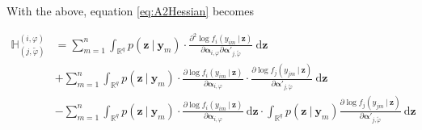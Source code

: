 \documentclass[11pt, a4paper]{article}
\newcommand{\R}{{\ensuremath{\mathbb{R}}}}
\newcommand{\cond}{\!~|~\!}
\begin{document}
With the above, equation \eqref{eq:A2Hessian} becomes

\begin{align*}
\mathbb{H}_{(j,\tilde{\varphi})}^{(i,\varphi)} & =  \sum\limits_{m=1}^{n} \int_{\R^q} p(\mathbf{z} \cond \mathbf{y}_m) \cdot \frac{\partial^2 \log f_i(y_{im} \cond \mathbf{z})}{\partial \bm{\alpha}_{i,\varphi} \partial \bm{\alpha}'_{j,\tilde{\varphi}}} ~ \text{d}\mathbf{z} \\[3mm]
& + \sum\limits_{m=1}^{n} \int_{\R^q} p(\mathbf{z} \cond \mathbf{y}_m) \cdot \frac{\partial \log f_i(y_{im} \cond \mathbf{z})}{\partial \bm{\alpha}_{i,\varphi}} \cdot \frac{\partial \log f_j(y_{jm} \cond \mathbf{z})}{\partial \bm{\alpha}'_{j,\tilde{\varphi}}} ~ \text{d}\mathbf{z} \\[3mm]
& - \sum\limits_{m=1}^{n} \int_{\R^q} p(\mathbf{z} \cond \mathbf{y}_m) \cdot \frac{\partial \log f_i(y_{im} \cond \mathbf{z})}{\partial \bm{\alpha}_{i,\varphi}} ~ \text{d}\mathbf{z} \cdot \int_{\R^q} p(\mathbf{z} \cond \mathbf{y}_m) \frac{\partial  \log f_j(y_{jm} \cond \mathbf{z})}{\partial \bm{\alpha}'_{j,\tilde{\varphi}}} ~\text{d}\mathbf{z} \label{eq:A3Hessian2} \tag{A3}
\end{align*}
\end{document}
